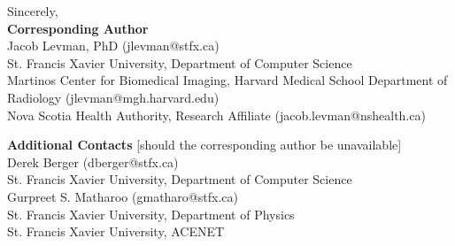 \documentclass[10pt,letter]{article}
\begin{document}
\bigskip

\noindent
Sincerely, \\

\small
\noindent
\textbf{Corresponding Author}\\
Jacob Levman, PhD (jlevman@stfx.ca) \\
\footnotesize
\hspace*{0.25cm}St. Francis Xavier University, Department of Computer Science  \\
\hspace*{0.25cm}Martinos Center for Biomedical Imaging, Harvard Medical School Department of Radiology (jlevman@mgh.harvard.edu) \\
\hspace*{0.25cm}Nova Scotia Health Authority, Research Affiliate (jacob.levman@nshealth.ca) \\
\normalsize

\small
\noindent
\textbf{Additional Contacts} [should the corresponding author be unavailable]\\
Derek Berger (dberger@stfx.ca)\\
\footnotesize
\hspace*{0.25cm} St. Francis Xavier University, Department of Computer Science \\
\small
Gurpreet S. Matharoo (gmatharo@stfx.ca) \\
\footnotesize
\hspace*{0.25cm} St. Francis Xavier University, Department of Physics \\
\hspace*{0.25cm} St. Francis Xavier University, ACENET
\normalsize






% 
\end{document}

